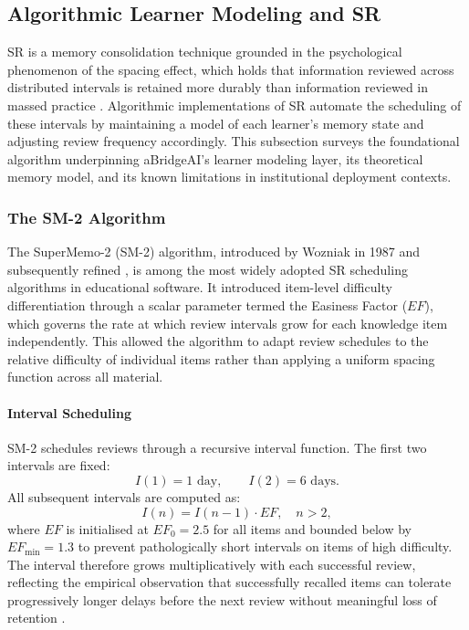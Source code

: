 \subsection{Algorithmic Learner Modeling and SR}

SR is a memory consolidation technique grounded in the psychological phenomenon of the spacing effect, which holds that information reviewed across distributed intervals is retained more durably than information reviewed in massed practice \cite{ebbinghaus1885memory, cepada2006}. Algorithmic implementations of SR automate the scheduling of these intervals by maintaining a model of each learner's memory state and adjusting review frequency accordingly. This subsection surveys the foundational algorithm underpinning aBridgeAI's learner modeling layer, its theoretical memory model, and its known limitations in institutional deployment contexts.

\subsubsection{The SM-2 Algorithm}
\label{sec:sm2_limitation}
The SuperMemo-2 (SM-2) algorithm, introduced by Wozniak in 1987 and subsequently refined \cite{wozniak1998sm2}, is among the most widely adopted SR scheduling algorithms in educational software. It introduced item-level difficulty differentiation through a scalar parameter termed the Easiness Factor ($EF$), which governs the rate at which review intervals grow for each knowledge item independently. This allowed the algorithm to adapt review schedules to the relative difficulty of individual items rather than applying a uniform spacing function across all material.

\paragraph{Interval Scheduling}
SM-2 schedules reviews through a recursive interval function. The first two intervals are fixed:
\begin{equation}
    I(1) = 1 \text{ day}, \qquad I(2) = 6 \text{ days}.
    \label{eq:sm2_base_intervals}
\end{equation}
All subsequent intervals are computed as:
\begin{equation}
    I(n) = I(n-1) \cdot EF, \quad n > 2,
    \label{eq:sm2_interval}
\end{equation}
where $EF$ is initialised at $EF_0 = 2.5$ for all items and bounded below by $EF_{\min} = 1.3$ to prevent pathologically short intervals on items of high difficulty. The interval therefore grows multiplicatively with each successful review, reflecting the empirical observation that successfully recalled items can tolerate progressively longer delays before the next review without meaningful loss of retention \cite{wozniak1998sm2}.

